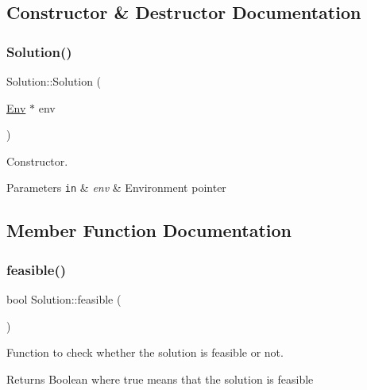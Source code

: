 \subsection{Constructor \& Destructor Documentation}
\mbox{\label{class_solution_a3bdbdf455adecf7ab0f71bbce1efad66}} 
\subsubsection{\texorpdfstring{Solution()}{Solution()}}
{\footnotesize\ttfamily Solution\+::\+Solution (\begin{DoxyParamCaption}\item[{\hyperlink{class_env}{Env} $\ast$}]{env }\end{DoxyParamCaption})}



Constructor. 


\begin{DoxyParams}[1]{Parameters}
\mbox{\tt in}  & {\em env} & Environment pointer \\
\hline
\end{DoxyParams}


\subsection{Member Function Documentation}
\mbox{\label{class_solution_a13e4ebdccdbc8c572a82fb21254022d0}} 
\subsubsection{\texorpdfstring{feasible()}{feasible()}}
{\footnotesize\ttfamily bool Solution\+::feasible (\begin{DoxyParamCaption}{ }\end{DoxyParamCaption})}



Function to check whether the solution is feasible or not. 

\begin{DoxyReturn}{Returns}
Boolean where true means that the solution is feasible 
\end{DoxyReturn}
\mbox{\label{class_solution_a227aaabdf34fbd2e01283728a5a344fe}} 
